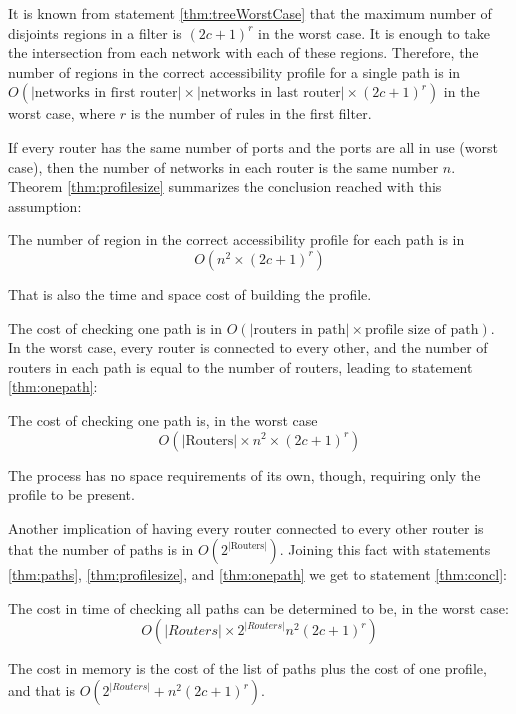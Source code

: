 It is known from statement \ref{thm:treeWorstCase} that the maximum number of
disjoints regions in a filter is $(2c + 1)^r$ in the worst case. It is enough
to take the intersection from each network with each of these regions. Therefore, 
the number of regions in the correct accessibility profile for a single path is in
$O(|\mbox{networks in first router}| \times |\mbox{networks in last router}| \times (2c+1)^r)$
in the worst case, where $r$ is the number of rules in the first filter.

If every router has the same number of ports and the ports are all in use (worst
case), then the number of networks in each router is the same number $n$.
Theorem \ref{thm:profilesize} summarizes the conclusion reached with this
assumption:

\begin{mathstatement}
	\label{thm:profilesize}
	The number of region in the correct accessibility profile for each path is in
	\[O\left(n^2 \times (2c+1)^r\right)\]
	
	That is also the time and space cost of building the profile.
\end{mathstatement}

The cost of checking one path is in
$O(|\mbox{routers in path}| \times \mbox{profile size of path})$. In the worst
case, every router is connected to every other, and the number of routers in
each
path is equal to the number of routers, leading to statement \ref{thm:onepath}:

\begin{mathstatement}
	\label{thm:onepath}
	The cost of checking one path is, in the worst case
	\[O\left(|\mbox{Routers}| \times n^2 \times (2c+1)^r\right)\]
	
	The process has no space requirements of its own, though, requiring only the
	profile to be present.
\end{mathstatement}

Another implication of having every router connected to every other router is
that the number of paths is in $O\left(2^{|\mbox{Routers}|}\right)$. Joining
this fact with statements \ref{thm:paths}, \ref{thm:profilesize}, and
\ref{thm:onepath} we get to statement \ref{thm:concl}:

\begin{mathstatement}
	\label{thm:concl}
	The cost in time of checking all paths can be determined
	to be, in the worst case:
	\[O\left(|Routers| \times 2^{|Routers|} n^2 (2c+1)^r\right)\]

	The cost in memory is the cost of the list of paths plus the cost of one
	profile, and that is $O\left(2^{|Routers|} + n^2 (2c+1)^r\right)$.
\end{mathstatement}

